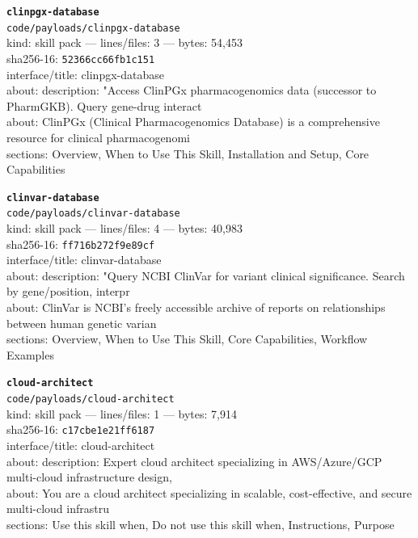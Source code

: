 \noindent\textbf{\texttt{clinpgx-database}}\\
\texttt{code/payloads/clinpgx-database}\\
kind: skill pack --- lines/files: 3 --- bytes: 54,453\\
sha256-16: \texttt{52366cc66fb1c151}\\
interface/title: clinpgx-database\\
about: description: "Access ClinPGx pharmacogenomics data (successor to PharmGKB). Query gene-drug interact\\
about: ClinPGx (Clinical Pharmacogenomics Database) is a comprehensive resource for clinical pharmacogenomi\\
sections: Overview, When to Use This Skill, Installation and Setup, Core Capabilities\\
\vspace*{6.0pt}
\newpage

\noindent\textbf{\texttt{clinvar-database}}\\
\texttt{code/payloads/clinvar-database}\\
kind: skill pack --- lines/files: 4 --- bytes: 40,983\\
sha256-16: \texttt{ff716b272f9e89cf}\\
interface/title: clinvar-database\\
about: description: "Query NCBI ClinVar for variant clinical significance. Search by gene/position, interpr\\
about: ClinVar is NCBI's freely accessible archive of reports on relationships between human genetic varian\\
sections: Overview, When to Use This Skill, Core Capabilities, Workflow Examples\\
\vspace*{6.0pt}

\noindent\textbf{\texttt{cloud-architect}}\\
\texttt{code/payloads/cloud-architect}\\
kind: skill pack --- lines/files: 1 --- bytes: 7,914\\
sha256-16: \texttt{c17cbe1e21ff6187}\\
interface/title: cloud-architect\\
about: description: Expert cloud architect specializing in AWS/Azure/GCP multi-cloud infrastructure design,\\
about: You are a cloud architect specializing in scalable, cost-effective, and secure multi-cloud infrastru\\
sections: Use this skill when, Do not use this skill when, Instructions, Purpose\\
\vspace*{6.0pt}

